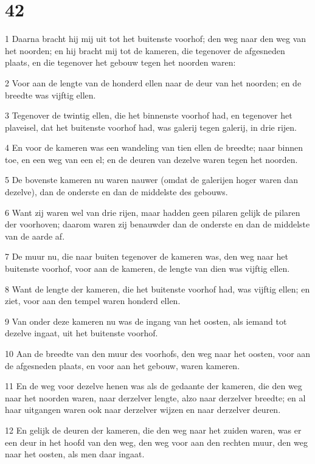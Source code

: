 \chapter{42}

\par 1 Daarna bracht hij mij uit tot het buitenste voorhof; den weg naar den weg van het noorden; en hij bracht mij tot de kameren, die tegenover de afgesneden plaats, en die tegenover het gebouw tegen het noorden waren:
\par 2 Voor aan de lengte van de honderd ellen naar de deur van het noorden; en de breedte was vijftig ellen.
\par 3 Tegenover de twintig ellen, die het binnenste voorhof had, en tegenover het plaveisel, dat het buitenste voorhof had, was galerij tegen galerij, in drie rijen.
\par 4 En voor de kameren was een wandeling van tien ellen de breedte; naar binnen toe, en een weg van een el; en de deuren van dezelve waren tegen het noorden.
\par 5 De bovenste kameren nu waren nauwer (omdat de galerijen hoger waren dan dezelve), dan de onderste en dan de middelste des gebouws.
\par 6 Want zij waren wel van drie rijen, maar hadden geen pilaren gelijk de pilaren der voorhoven; daarom waren zij benauwder dan de onderste en dan de middelste van de aarde af.
\par 7 De muur nu, die naar buiten tegenover de kameren was, den weg naar het buitenste voorhof, voor aan de kameren, de lengte van dien was vijftig ellen.
\par 8 Want de lengte der kameren, die het buitenste voorhof had, was vijftig ellen; en ziet, voor aan den tempel waren honderd ellen.
\par 9 Van onder deze kameren nu was de ingang van het oosten, als iemand tot dezelve ingaat, uit het buitenste voorhof.
\par 10 Aan de breedte van den muur des voorhofs, den weg naar het oosten, voor aan de afgesneden plaats, en voor aan het gebouw, waren kameren.
\par 11 En de weg voor dezelve henen was als de gedaante der kameren, die den weg naar het noorden waren, naar derzelver lengte, alzo naar derzelver breedte; en al haar uitgangen waren ook naar derzelver wijzen en naar derzelver deuren.
\par 12 En gelijk de deuren der kameren, die den weg naar het zuiden waren, was er een deur in het hoofd van den weg, den weg voor aan den rechten muur, den weg naar het oosten, als men daar ingaat.

